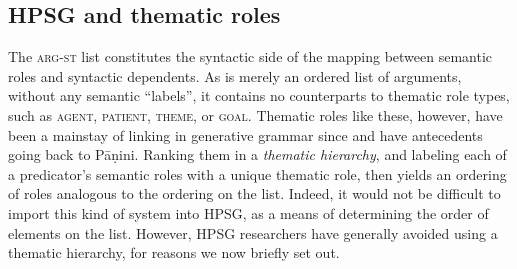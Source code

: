 \documentclass[output=paper
                ,modfonts
                ,nonflat
	        ,collection
	        ,collectionchapter
	        ,collectiontoclongg
 	        ,biblatex
                ,babelshorthands
                ,newtxmath
                ,draftmode
                ,colorlinks, citecolor=brown
]{./langsci/langscibook}
\begin{document}

\subsection{HPSG and thematic roles}
\label{thetaroles}


The \textsc{arg-st} list constitutes the syntactic side of the mapping between semantic roles and syntactic dependents.  As \argst is merely an ordered list of arguments, without any semantic ``labels'', it contains no counterparts to thematic role types, such as \textsc{agent}, \textsc{patient}, \textsc{theme}, or \textsc{goal}.  Thematic roles like these, however, have been a mainstay of linking in generative grammar since \citet{Fillmore1968} and have antecedents going back to P\={a}\d{n}ini.
Ranking them in a  \emph{thematic hierarchy}, and labeling each of a predicator's semantic roles with a unique thematic role, then yields an ordering of roles analogous to the ordering on the \argst list.  Indeed, it would not be difficult to import this kind of system into HPSG, as a means of determining the order of elements on the \argst list.  However, HPSG researchers have generally avoided using a thematic hierarchy, for reasons we now briefly set out.
\end{document}
